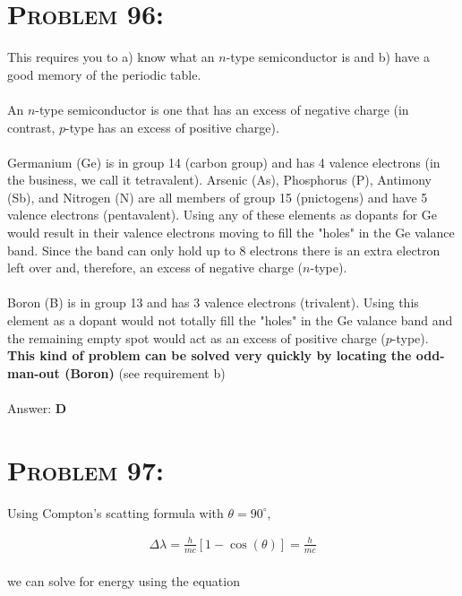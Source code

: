 \documentclass{article}
\begin{document}

\section{\textsc{Problem 96:}} This requires you to a) know what an $n$-type semiconductor is and b) have a good memory of the periodic table.
\\\\ An $n$-type semiconductor is one that has an excess of negative charge (in contrast, $p$-type has an excess of positive charge).
\\\\Germanium (Ge) is in group 14 (carbon group) and has 4 valence electrons (in the business, we call it tetravalent). Arsenic (As), Phosphorus (P), Antimony (Sb), and Nitrogen (N) are all members of group 15 (pnictogens) and have 5 valence electrons (pentavalent). Using any of these elements as dopants for Ge would result in their valence electrons moving to fill the "holes" in the Ge valance band. Since the band can only hold up to 8 electrons there is an extra electron left over and, therefore, an excess of negative charge ($n$-type).
\\\\Boron (B) is in group 13 and has 3 valence electrons (trivalent). Using this element as a dopant would not totally fill the "holes" in the Ge valance band and the remaining empty spot would act as an excess of positive charge ($p$-type). \textbf{This kind of problem can be solved very quickly by locating the odd-man-out (Boron)} (see requirement b)
\\\\
Answer: \textbf{\textcolor{ProcessBlue}D}\\


\section{\textsc{Problem 97:}} Using Compton's scatting formula with $\theta = 90^{\circ}$,

\begin{gather}
\Delta \lambda = \frac{h}{mc} [1 - \cos{(\theta)}] = \frac{h}{mc}
\end{gather}
\\
we can solve for energy using the equation
\end{document}
